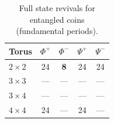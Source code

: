 \begin{table}[H]
\centering
\caption{Full state revivals for entangled coins (fundamental periods).}
\label{tab:revivals}
\begin{tabular}{lcccc}
\toprule
\textbf{Torus} & $\Phi^+$ & $\Phi^-$ & $\Psi^+$ & $\Psi^-$ \\
\midrule
$2 \times 2$ & 24 & \textbf{8} & 24 & 24 \\
$3 \times 3$ & --- & --- & --- & --- \\
$3 \times 4$ & --- & --- & --- & --- \\
$4 \times 4$ & 24 & --- & 24 & --- \\
\bottomrule
\end{tabular}
\end{table}
